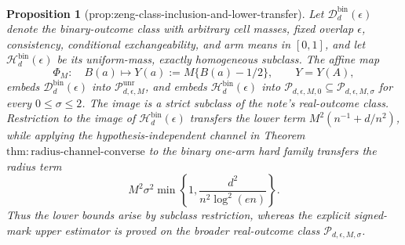 \documentclass{article}
\newtheorem{proposition}{Proposition}
\begin{document}
\begin{proposition}[prop:zeng-class-inclusion-and-lower-transfer]\label{prop:zeng-class-inclusion-and-lower-transfer}
Let \(\mathcal D_d^{\mathrm{bin}}(\epsilon)\) denote the binary-outcome class with arbitrary cell masses, fixed overlap \(\epsilon\), consistency, conditional exchangeability, and arm means in \([0,1]\), and let \(\mathcal H_d^{\mathrm{bin}}(\epsilon)\) be its uniform-mass, exactly homogeneous subclass.  The affine map
\[
 \Phi_M:\quad B(a)\longmapsto Y(a):=M\{B(a)-1/2\},\qquad Y=Y(A),
\]
embeds \(\mathcal D_d^{\mathrm{bin}}(\epsilon)\) into \(\mathcal P_{d,\epsilon,M}^{\mathrm{unr}}\), and embeds \(\mathcal H_d^{\mathrm{bin}}(\epsilon)\) into \(\mathcal P_{d,\epsilon,M,0}\subseteq\mathcal P_{d,\epsilon,M,\sigma}\) for every \(0\le\sigma\le2\).  The image is a strict subclass of the note's real-outcome class.  Restriction to the image of \(\mathcal H_d^{\mathrm{bin}}(\epsilon)\) transfers the lower term \(M^2(n^{-1}+d/n^2)\), while applying the hypothesis-independent channel in Theorem~\(\mathrm{thm:radius\text{-}channel\text{-}converse}\) to the binary one-arm hard family transfers the radius term
\[
 M^2\sigma^2\min\left\{1,\frac{d^2}{n^2\log^2(en)}\right\}.
\]
Thus the lower bounds arise by subclass restriction, whereas the explicit signed-mark upper estimator is proved on the broader real-outcome class \(\mathcal P_{d,\epsilon,M,\sigma}\).
\end{proposition}
\end{document}
